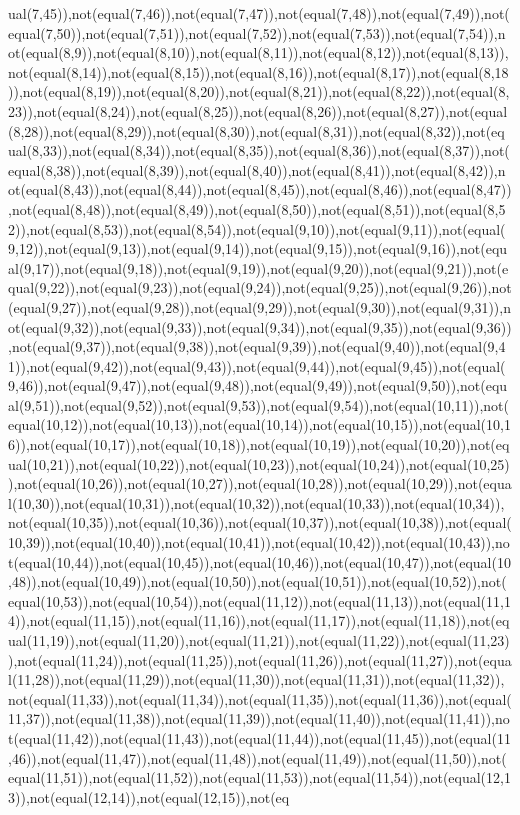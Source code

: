 ual(7,45)),not(equal(7,46)),not(equal(7,47)),not(equal(7,48)),not(equal(7,49)),not(equal(7,50)),not(equal(7,51)),not(equal(7,52)),not(equal(7,53)),not(equal(7,54)),not(equal(8,9)),not(equal(8,10)),not(equal(8,11)),not(equal(8,12)),not(equal(8,13)),not(equal(8,14)),not(equal(8,15)),not(equal(8,16)),not(equal(8,17)),not(equal(8,18)),not(equal(8,19)),not(equal(8,20)),not(equal(8,21)),not(equal(8,22)),not(equal(8,23)),not(equal(8,24)),not(equal(8,25)),not(equal(8,26)),not(equal(8,27)),not(equal(8,28)),not(equal(8,29)),not(equal(8,30)),not(equal(8,31)),not(equal(8,32)),not(equal(8,33)),not(equal(8,34)),not(equal(8,35)),not(equal(8,36)),not(equal(8,37)),not(equal(8,38)),not(equal(8,39)),not(equal(8,40)),not(equal(8,41)),not(equal(8,42)),not(equal(8,43)),not(equal(8,44)),not(equal(8,45)),not(equal(8,46)),not(equal(8,47)),not(equal(8,48)),not(equal(8,49)),not(equal(8,50)),not(equal(8,51)),not(equal(8,52)),not(equal(8,53)),not(equal(8,54)),not(equal(9,10)),not(equal(9,11)),not(equal(9,12)),not(equal(9,13)),not(equal(9,14)),not(equal(9,15)),not(equal(9,16)),not(equal(9,17)),not(equal(9,18)),not(equal(9,19)),not(equal(9,20)),not(equal(9,21)),not(equal(9,22)),not(equal(9,23)),not(equal(9,24)),not(equal(9,25)),not(equal(9,26)),not(equal(9,27)),not(equal(9,28)),not(equal(9,29)),not(equal(9,30)),not(equal(9,31)),not(equal(9,32)),not(equal(9,33)),not(equal(9,34)),not(equal(9,35)),not(equal(9,36)),not(equal(9,37)),not(equal(9,38)),not(equal(9,39)),not(equal(9,40)),not(equal(9,41)),not(equal(9,42)),not(equal(9,43)),not(equal(9,44)),not(equal(9,45)),not(equal(9,46)),not(equal(9,47)),not(equal(9,48)),not(equal(9,49)),not(equal(9,50)),not(equal(9,51)),not(equal(9,52)),not(equal(9,53)),not(equal(9,54)),not(equal(10,11)),not(equal(10,12)),not(equal(10,13)),not(equal(10,14)),not(equal(10,15)),not(equal(10,16)),not(equal(10,17)),not(equal(10,18)),not(equal(10,19)),not(equal(10,20)),not(equal(10,21)),not(equal(10,22)),not(equal(10,23)),not(equal(10,24)),not(equal(10,25)),not(equal(10,26)),not(equal(10,27)),not(equal(10,28)),not(equal(10,29)),not(equal(10,30)),not(equal(10,31)),not(equal(10,32)),not(equal(10,33)),not(equal(10,34)),not(equal(10,35)),not(equal(10,36)),not(equal(10,37)),not(equal(10,38)),not(equal(10,39)),not(equal(10,40)),not(equal(10,41)),not(equal(10,42)),not(equal(10,43)),not(equal(10,44)),not(equal(10,45)),not(equal(10,46)),not(equal(10,47)),not(equal(10,48)),not(equal(10,49)),not(equal(10,50)),not(equal(10,51)),not(equal(10,52)),not(equal(10,53)),not(equal(10,54)),not(equal(11,12)),not(equal(11,13)),not(equal(11,14)),not(equal(11,15)),not(equal(11,16)),not(equal(11,17)),not(equal(11,18)),not(equal(11,19)),not(equal(11,20)),not(equal(11,21)),not(equal(11,22)),not(equal(11,23)),not(equal(11,24)),not(equal(11,25)),not(equal(11,26)),not(equal(11,27)),not(equal(11,28)),not(equal(11,29)),not(equal(11,30)),not(equal(11,31)),not(equal(11,32)),not(equal(11,33)),not(equal(11,34)),not(equal(11,35)),not(equal(11,36)),not(equal(11,37)),not(equal(11,38)),not(equal(11,39)),not(equal(11,40)),not(equal(11,41)),not(equal(11,42)),not(equal(11,43)),not(equal(11,44)),not(equal(11,45)),not(equal(11,46)),not(equal(11,47)),not(equal(11,48)),not(equal(11,49)),not(equal(11,50)),not(equal(11,51)),not(equal(11,52)),not(equal(11,53)),not(equal(11,54)),not(equal(12,13)),not(equal(12,14)),not(equal(12,15)),not(eq